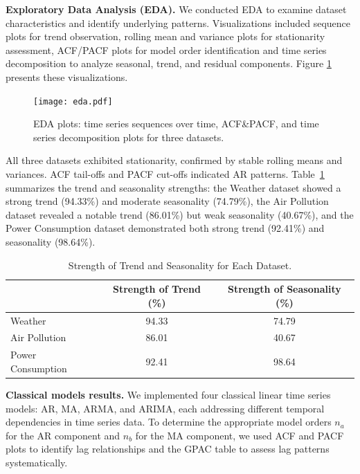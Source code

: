 \documentclass[sn-mathphys-num]{sn-jnl}
\theoremstyle{thmstyleone}%
\theoremstyle{thmstyletwo}%
\theoremstyle{thmstylethree}%
\begin{document}
\textbf{Exploratory Data Analysis (EDA).} We conducted EDA to examine dataset characteristics and identify underlying patterns. Visualizations included sequence plots for trend observation, rolling mean and variance plots for stationarity assessment, ACF/PACF plots for model order identification and time series decomposition to analyze seasonal, trend, and residual components. Figure \ref{fig:eda_plot} presents these visualizations.
\begin{figure}[]
	\begin{center}
	\texttt{[image: eda.pdf]}
	\end{center}
	\caption{EDA plots: time series sequences over time, ACF\&PACF, and time series decomposition plots for three datasets.}
	\label{fig:eda_plot}
\end{figure}
All three datasets exhibited stationarity, confirmed by stable rolling means and variances. ACF tail-offs and PACF cut-offs indicated AR patterns. Table~\ref{tab:trend_seasonality} summarizes the trend and seasonality strengths: the Weather dataset showed a strong trend (94.33\%) and moderate seasonality (74.79\%), the Air Pollution dataset revealed a notable trend (86.01\%) but weak seasonality (40.67\%), and the Power Consumption dataset demonstrated both strong trend (92.41\%) and seasonality (98.64\%). 
\begin{table}[h]
\centering
\begin{tabular}{lcc}
\hline
\textbf{}        & \textbf{Strength of Trend (\%)} & \hspace{0.5cm}\textbf{Strength of Seasonality (\%)} \\ \hline
Weather                 & 94.33                          & 74.79                                 \\ 
Air Pollution           & 86.01                          & 40.67                                 \\ 
Power Consumption       & 92.41                          & 98.64                                 \\ \hline
\end{tabular}
\caption{Strength of Trend and Seasonality for Each Dataset.}
\label{tab:trend_seasonality}
\end{table}

\textbf{Classical models results.} We implemented four classical linear time series models: AR, MA, ARMA, and ARIMA, each addressing different temporal dependencies in time series data. To determine the appropriate model orders \(n_a\) for the AR component and \(n_b\) for the MA component, we used ACF and PACF plots to identify lag relationships and the GPAC table to assess lag patterns systematically. 
\end{document}
